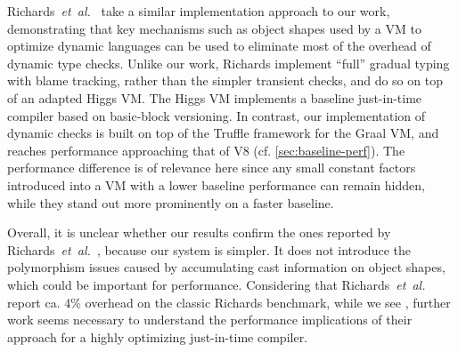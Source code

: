Richards~\textit{et~al.}~\cite{Richards2017} take a similar implementation
approach to our work, demonstrating that key mechanisms such as object shapes
used by a VM to optimize dynamic languages can be used to eliminate most of
the overhead of dynamic type checks.
Unlike our work, Richards
implement ``full'' gradual typing with blame tracking, rather than
the simpler transient checks, and do so on top of an adapted Higgs
VM.
The Higgs VM implements a baseline just-in-time compiler based on
basic-block versioning\citep{Chevalier-Boisvert:2016:ITS}.
In contrast, our implementation of dynamic checks
is built on top of the Truffle framework for the Graal VM, and reaches
performance approaching that of V8 (cf. \cref{sec:baseline-perf}).
The performance difference is of relevance here since any small constant factors
introduced into a VM with a lower baseline performance can remain hidden,
while they stand out more prominently on a faster baseline.

Overall, it is unclear whether our results confirm the ones
reported by Richards~\textit{et~al.}~\cite{Richards2017},
because our system is simpler.
It does not introduce the polymorphism
issues caused by accumulating cast information on object shapes,
which could be important for performance.
Considering that Richards~\textit{et~al.} report ca. 4\% overhead
on the classic Richards benchmark, while we see \OverheadRichardsP,
further work seems necessary to understand the performance implications of
their approach for a highly optimizing just-in-time compiler.

%



